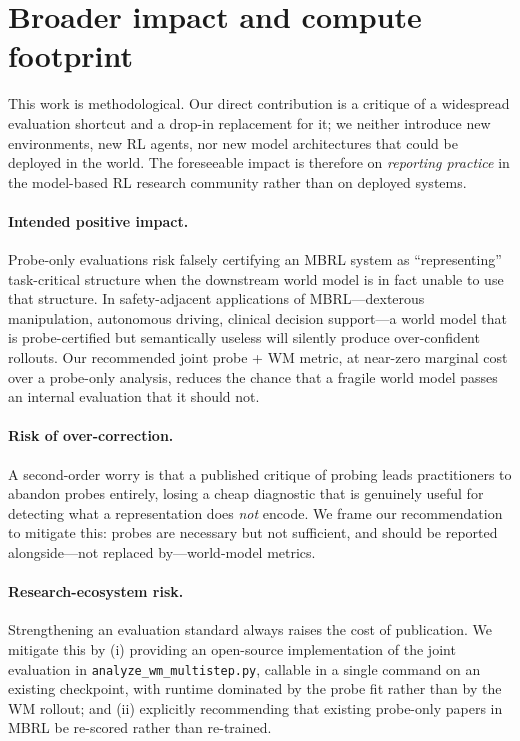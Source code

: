 \documentclass{article}
\begin{document}
\section{Broader impact and compute footprint}\label{app:impact}

This work is methodological. Our direct contribution is a critique of a widespread evaluation shortcut and a drop-in replacement for it; we neither introduce new environments, new RL agents, nor new model architectures that could be deployed in the world. The foreseeable impact is therefore on \emph{reporting practice} in the model-based RL research community rather than on deployed systems.

\paragraph{Intended positive impact.}
Probe-only evaluations risk falsely certifying an MBRL system as ``representing'' task-critical structure when the downstream world model is in fact unable to use that structure. In safety-adjacent applications of MBRL---dexterous manipulation, autonomous driving, clinical decision support---a world model that is probe-certified but semantically useless will silently produce over-confident rollouts. Our recommended joint probe + WM metric, at near-zero marginal cost over a probe-only analysis, reduces the chance that a fragile world model passes an internal evaluation that it should not.

\paragraph{Risk of over-correction.}
A second-order worry is that a published critique of probing leads practitioners to abandon probes entirely, losing a cheap diagnostic that is genuinely useful for detecting what a representation does \emph{not} encode. We frame our recommendation to mitigate this: probes are necessary but not sufficient, and should be reported alongside---not replaced by---world-model metrics.

\paragraph{Research-ecosystem risk.}
Strengthening an evaluation standard always raises the cost of publication. We mitigate this by (i) providing an open-source implementation of the joint evaluation in \texttt{analyze\_wm\_multistep.py}, callable in a single command on an existing checkpoint, with runtime dominated by the probe fit rather than by the WM rollout; and (ii) explicitly recommending that existing probe-only papers in MBRL be re-scored rather than re-trained.
\end{document}
